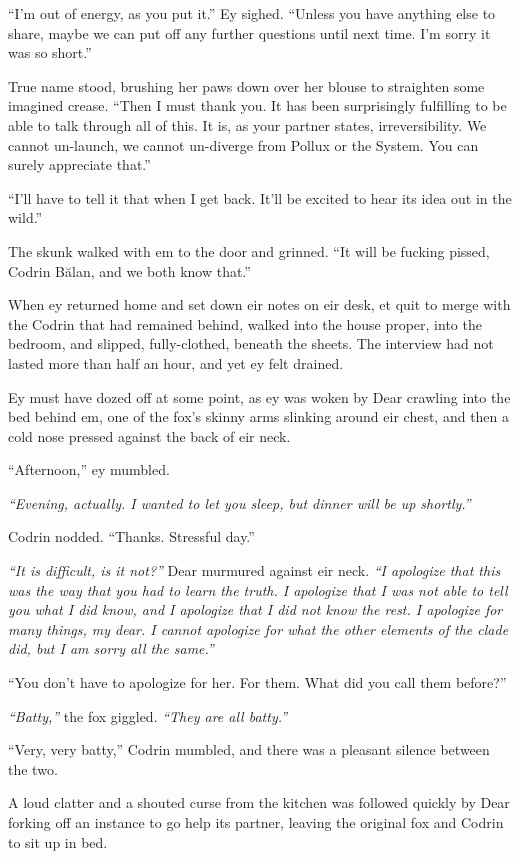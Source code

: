 ``I'm out of energy, as you put it.'' Ey sighed. ``Unless you have anything else to share, maybe we can put off any further questions until next time. I'm sorry it was so short.''

True name stood, brushing her paws down over her blouse to straighten some imagined crease. ``Then I must thank you. It has been surprisingly fulfilling to be able to talk through all of this. It is, as your partner states, irreversibility. We cannot un-launch, we cannot un-diverge from Pollux or the System. You can surely appreciate that.''

``I'll have to tell it that when I get back. It'll be excited to hear its idea out in the wild.''

The skunk walked with em to the door and grinned. ``It will be fucking pissed, Codrin Bălan, and we both know that.''

When ey returned home and set down eir notes on eir desk, et quit to merge with the Codrin that had remained behind, walked into the house proper, into the bedroom, and slipped, fully-clothed, beneath the sheets. The interview had not lasted more than half an hour, and yet ey felt drained.

Ey must have dozed off at some point, as ey was woken by Dear crawling into the bed behind em, one of the fox's skinny arms slinking around eir chest, and then a cold nose pressed against the back of eir neck.

``Afternoon,'' ey mumbled.

\emph{``Evening, actually. I wanted to let you sleep, but dinner will be up shortly.''}

Codrin nodded. ``Thanks. Stressful day.''

\emph{``It is difficult, is it not?''} Dear murmured against eir neck. \emph{``I apologize that this was the way that you had to learn the truth. I apologize that I was not able to tell you what I did know, and I apologize that I did not know the rest. I apologize for many things, my dear. I cannot apologize for what the other elements of the clade did, but I am sorry all the same.''}

``You don't have to apologize for her. For them. What did you call them before?''

\emph{``Batty,''} the fox giggled. \emph{``They are all batty.''}

``Very, very batty,'' Codrin mumbled, and there was a pleasant silence between the two.

A loud clatter and a shouted curse from the kitchen was followed quickly by Dear forking off an instance to go help its partner, leaving the original fox and Codrin to sit up in bed.

